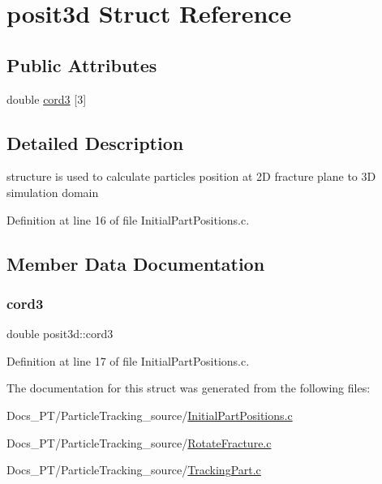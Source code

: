 \hypertarget{structposit3d}{}\section{posit3d Struct Reference}
\label{structposit3d}
\subsection*{Public Attributes}
\begin{DoxyCompactItemize}
\item 
double \mbox{\hyperlink{structposit3d_aefc0a716be214a76cae4e2176134c28e}{cord3}} \mbox{[}3\mbox{]}
\end{DoxyCompactItemize}


\subsection{Detailed Description}
structure is used to calculate particle\textquotesingle{}s position at 2D fracture plane to 3D simulation domain 

Definition at line 16 of file Initial\+Part\+Positions.\+c.



\subsection{Member Data Documentation}
\mbox{\label{structposit3d_aefc0a716be214a76cae4e2176134c28e}} 
\subsubsection{\texorpdfstring{cord3}{cord3}}
{\footnotesize\ttfamily double posit3d\+::cord3}



Definition at line 17 of file Initial\+Part\+Positions.\+c.



The documentation for this struct was generated from the following files\+:\begin{DoxyCompactItemize}
\item 
Docs\+\_\+\+P\+T/\+Particle\+Tracking\+\_\+source/\mbox{\hyperlink{_initial_part_positions_8c}{Initial\+Part\+Positions.\+c}}\item 
Docs\+\_\+\+P\+T/\+Particle\+Tracking\+\_\+source/\mbox{\hyperlink{_rotate_fracture_8c}{Rotate\+Fracture.\+c}}\item 
Docs\+\_\+\+P\+T/\+Particle\+Tracking\+\_\+source/\mbox{\hyperlink{_tracking_part_8c}{Tracking\+Part.\+c}}\end{DoxyCompactItemize}
